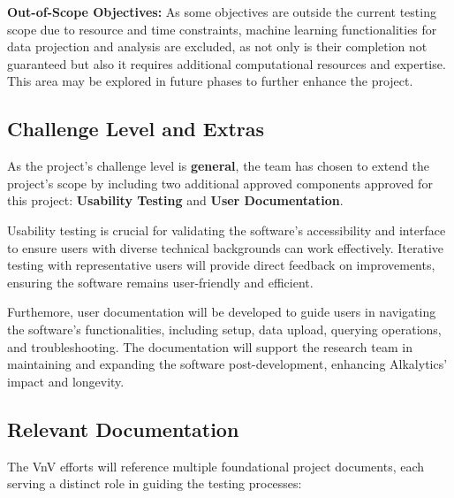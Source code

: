 \documentclass[12pt, titlepage]{article}
\begin{document}
\noindent \textbf{Out-of-Scope Objectives:} As some objectives are outside the
current testing scope due to resource and time constraints, machine learning
functionalities for data projection and analysis are excluded, as not only is
their completion not guaranteed but also it requires additional computational
resources and expertise. This area may be explored in future phases to further
enhance the project.


\subsection{Challenge Level and Extras}

As the project's challenge level is \textbf{general}, the team has chosen to
extend the project’s scope by including two additional approved components
approved for this project: \textbf{Usability Testing} and \textbf{User
Documentation}.
\newline

\noindent Usability testing is crucial for validating the software’s
accessibility and interface to ensure users with diverse technical backgrounds
can work effectively. Iterative testing with representative users will provide
direct feedback on improvements, ensuring the software remains user-friendly and
efficient. \newline 

\noindent Furthemore, user documentation will be developed to guide users in
navigating the software’s functionalities, including setup, data upload,
querying operations, and troubleshooting. The documentation will support the
research team in maintaining and expanding the software post-development,
enhancing Alkalytics' impact and longevity.

\subsection{Relevant Documentation}

The VnV efforts will reference multiple foundational project documents, each
serving a distinct role in guiding the testing processes:
\end{document}
